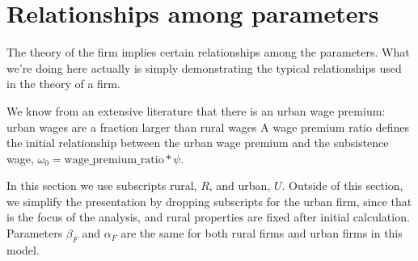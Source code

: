 \documentclass[]{article}
\begin{document}


\section{Relationships among parameters} \label{section-firm-initial-values}





The theory of the firm implies certain relationships among the parameters. What we're doing here actually is simply demonstrating the typical relationships used in the theory of a firm.


We know from an extensive  literature that there is an urban wage premium: urban wages are a fraction larger than  rural wages A wage premium ratio defines the initial relationship between the urban wage premium and the subsistence wage, $\omega_0 = \mathrm{wage\_premium\_ratio} * \psi$. %

In this section we use subscripts rural, $R$, and urban, $U$. Outside of this section, we simplify the presentation by dropping subscripts for the urban firm, since that is the focus of the analysis, and rural properties are fixed after initial calculation. 
Parameters $\beta_F$ and $\alpha_F$ are the same for both rural firms and urban firms in this model. 
\end{document}
